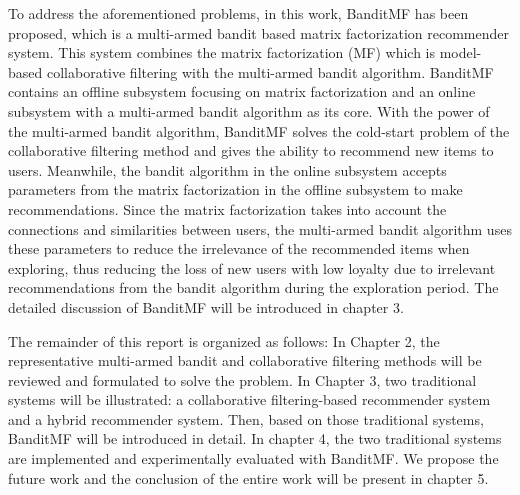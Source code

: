 To address the aforementioned problems, in this work, BanditMF has been proposed, which is a multi-armed bandit based matrix factorization recommender system. This system combines the matrix factorization (MF) which is model-based collaborative filtering with the multi-armed bandit algorithm. BanditMF contains an offline subsystem focusing on matrix factorization and an online subsystem with a multi-armed bandit algorithm as its core. With the power of the multi-armed bandit algorithm, BanditMF solves the cold-start problem of the collaborative filtering method and gives the ability to recommend new items to users. Meanwhile, the bandit algorithm in the online subsystem accepts parameters from the matrix factorization in the offline subsystem to make recommendations. Since the matrix factorization takes into account the connections and similarities between users, the multi-armed bandit algorithm uses these parameters to reduce the irrelevance of the recommended items when exploring, thus reducing the loss of new users with low loyalty due to irrelevant recommendations from the bandit algorithm during the exploration period. The detailed discussion of BanditMF will be introduced in chapter 3.

The remainder of this report is organized as follows: In Chapter 2, the representative multi-armed bandit and collaborative filtering methods will be reviewed and formulated to solve the problem. In Chapter 3, two traditional systems will be illustrated: a collaborative filtering-based recommender system and a hybrid recommender system. Then, based on those traditional systems, BanditMF will be introduced in detail. In chapter 4, the two traditional systems are implemented and experimentally evaluated with BanditMF. We propose the future work and the conclusion of the entire work will be present in chapter 5.
